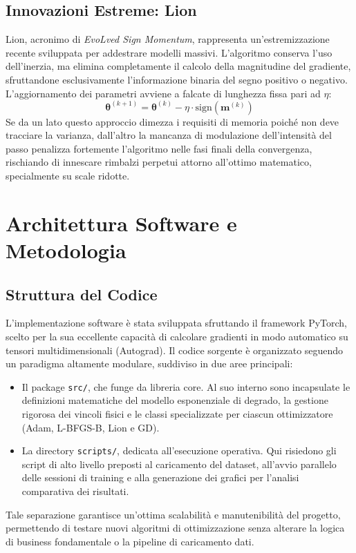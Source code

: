 \documentclass[11pt, a4paper]{article}
\begin{document}
\subsection{Innovazioni Estreme: Lion}
Lion, acronimo di \textit{EvoLved Sign Momentum}, rappresenta un'estremizzazione recente sviluppata per addestrare modelli massivi. L'algoritmo conserva l'uso dell'inerzia, ma elimina completamente il calcolo della magnitudine del gradiente, sfruttandone esclusivamente l'informazione binaria del segno positivo o negativo. L'aggiornamento dei parametri avviene a falcate di lunghezza fissa pari ad $\eta$:
\begin{equation}
    \boldsymbol{\theta}^{(k+1)} = \boldsymbol{\theta}^{(k)} - \eta \cdot \text{sign}(\mathbf{m}^{(k)})
\end{equation}
Se da un lato questo approccio dimezza i requisiti di memoria poiché non deve tracciare la varianza, dall'altro la mancanza di modulazione dell'intensità del passo penalizza fortemente l'algoritmo nelle fasi finali della convergenza, rischiando di innescare rimbalzi perpetui attorno all'ottimo matematico, specialmente su scale ridotte.

\section{Architettura Software e Metodologia}

\subsection{Struttura del Codice}
L'implementazione software è stata sviluppata sfruttando il framework PyTorch, scelto per la sua eccellente capacità di calcolare gradienti in modo automatico su tensori multidimensionali (Autograd). Il codice sorgente è organizzato seguendo un paradigma altamente modulare, suddiviso in due aree principali:
\begin{itemize}
    \item Il package \texttt{src/}, che funge da libreria core. Al suo interno sono incapsulate le definizioni matematiche del modello esponenziale di degrado, la gestione rigorosa dei vincoli fisici e le classi specializzate per ciascun ottimizzatore (Adam, L-BFGS-B, Lion e GD).
    \item La directory \texttt{scripts/}, dedicata all'esecuzione operativa. Qui risiedono gli script di alto livello preposti al caricamento del dataset, all'avvio parallelo delle sessioni di training e alla generazione dei grafici per l'analisi comparativa dei risultati.
\end{itemize}
Tale separazione garantisce un'ottima scalabilità e manutenibilità del progetto, permettendo di testare nuovi algoritmi di ottimizzazione senza alterare la logica di business fondamentale o la pipeline di caricamento dati.
\end{document}
